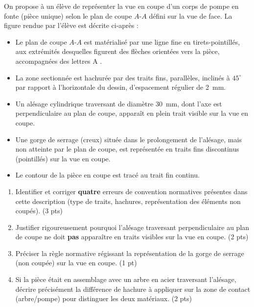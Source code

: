 \documentclass[11pt]{article}
\begin{document}
\begin{exercice}
On propose à un élève de représenter la vue en coupe d'un corps de pompe en fonte (pièce unique) selon le plan de coupe $A\text{-}A$ défini sur la vue de face. La figure rendue par l'élève est décrite ci-après : 
\begin{itemize}
    \item Le plan de coupe $A\text{-}A$ est matérialisé par une ligne fine en tirets-pointillés, aux extrémités desquelles figurent des flèches orientées vers la pièce, accompagnées des lettres \og A \fg.
    \item La zone sectionnée est hachurée par des traits fins, parallèles, inclinés à $45^\circ$ par rapport à l'horizontale du dessin, d'espacement régulier de \SI{2}{mm}.
    \item Un alésage cylindrique traversant de diamètre \SI{30}{mm}, dont l'axe est perpendiculaire au plan de coupe, apparaît en plein trait visible sur la vue en coupe.
    \item Une gorge de serrage (creux) située dans le prolongement de l'alésage, mais non atteinte par le plan de coupe, est représentée en traits fins discontinus (pointillés) sur la vue en coupe.
    \item Le contour de la pièce en coupe est tracé au trait fin continu.
\end{itemize}
\begin{enumerate}
    \item Identifier et corriger \textbf{quatre} erreurs de convention normatives présentes dans cette description (type de traits, hachures, représentation des éléments non coupés). (3 pts)
    \item Justifier rigoureusement pourquoi l'alésage traversant perpendiculaire au plan de coupe ne doit \textbf{pas} apparaître en traits visibles sur la vue en coupe. (2 pts)
    \item Préciser la règle normative régissant la représentation de la gorge de serrage (non coupée) sur la vue en coupe. (1 pt)
    \item Si la pièce était en assemblage avec un arbre en acier traversant l'alésage, décrire précisément la différence de hachure à appliquer sur la zone de contact (arbre/pompe) pour distinguer les deux matériaux. (2 pts)
\end{enumerate}
\end{exercice}
\end{document}
